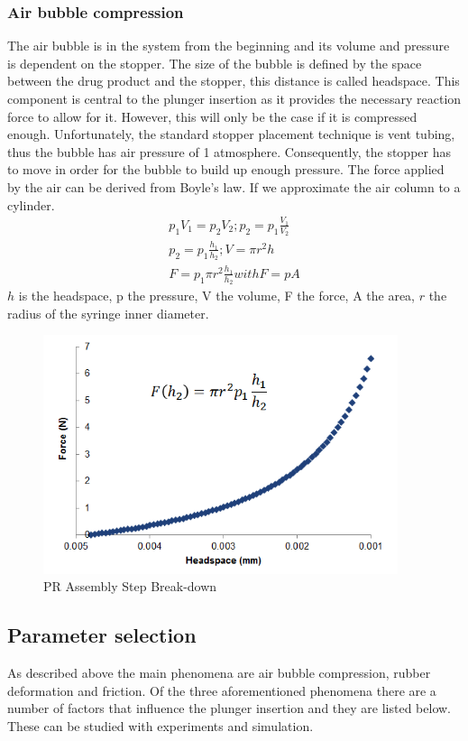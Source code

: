 \subsubsection{Air bubble compression}
The air bubble is in the system from the beginning and its volume and pressure is dependent on the stopper. 
The size of the bubble is defined by the space between the drug product and the stopper, this distance is called headspace.
This component is central to the plunger insertion as it provides the necessary reaction force to allow for it. However, this will only be the case if it is compressed enough. Unfortunately, the standard stopper placement technique is vent tubing, thus the bubble has air pressure of 1 atmosphere. Consequently, the stopper has to move in order for the bubble to build up enough pressure. The force applied by the air can be derived from Boyle's law. If we approximate the air column to a cylinder.
\begin{eqnarray}
p_1V_1=p_2V_2; p_2=p_1\frac{V_1}{V_2}\\
p_2=p_1\frac{h_1}{h_2}; V=\pi r^2 h\\
F=p_1\pi r^2 \frac{h_1}{h_2} with F=pA
\end{eqnarray}
$h$ is the headspace, p the pressure, V the volume, F the force, A the area, $r$ the radius of the syringe inner diameter. 
\begin{figure}[h!]	
	\centering
\includegraphics[height=7cm]{img/forceboyle.png}
   \caption{PR Assembly Step Break-down}
 \label{fgr:PFS}
\end{figure}

\newpage
\subsection{Parameter selection}

As described above the main phenomena are air bubble compression, rubber deformation and friction. Of the three aforementioned phenomena there are a number of factors that influence the plunger insertion and they are listed below. These can be studied with experiments and simulation.

